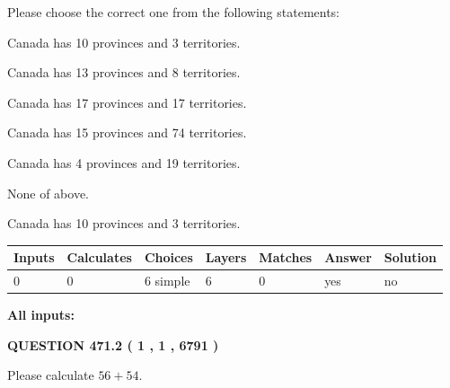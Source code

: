 \documentclass[12pt]{article}
\begin{document}
  
Please choose the correct one from the following statements:
 
 
Canada has 10  provinces and 3 territories.
 
 
Canada has  13 provinces and  8 territories.
 
 
Canada has  17 provinces and  17 territories.
 
 
Canada has  15 provinces and  74 territories.
 
 
Canada has   4 provinces and  19 territories.
 
 
 None of above.
 
 
\noindent{}
 
 
Canada has 10  provinces and 3 territories.
 
 
\noindent{}
 
 
   
   
   
   
\noindent\begin{tabular}{|l|l|l|l|l|l|l|}
 \hline
Inputs & Calculates & Choices & Layers & Matches & Answer & Solution \\ \hline
 0  & 
 0  & 
 6
  simple  
  & 
 6  & 
 0  & 
  yes & 
  no 
  \\ \hline
 \end{tabular}
   
   
   
   
\noindent{}
   
   
   
   
\noindent\vspace{0.1in}\hspace{-0.08in} {\textbf{\Large{All inputs: }}}
   
   
  
\vspace{0.2in}
  
{\textbf{\Large{QUESTION
471.2 
 ( 1 , 1 , 6791 )
}}}
  
  
 
Please calculate $ %
56 +  %
54 $.
 
 
 
\end{document}

